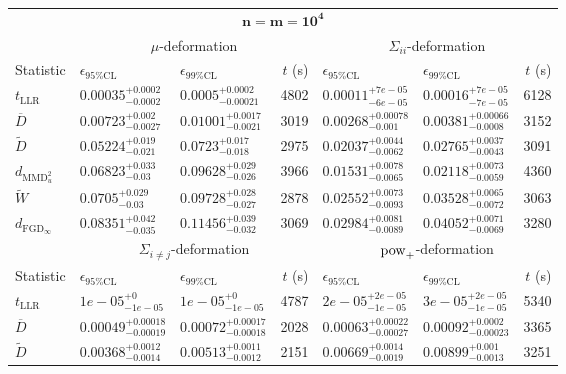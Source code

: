 \begin{tabular}{l|llr|llr}
	\toprule
	\multicolumn{7}{c}{$\mathbf{n=m=10^{4}}$} \\
	\multicolumn{1}{c}{} & \multicolumn{3}{c}{$\mu$-deformation} & \multicolumn{3}{c}{$\Sigma_{ii}$-deformation} \\
	Statistic & $\epsilon_{95\%\mathrm{CL}}$ & $\epsilon_{99\%\mathrm{CL}}$ & $t$ (s) & $\epsilon_{95\%\mathrm{CL}}$ & $\epsilon_{99\%\mathrm{CL}}$ & $t$ (s) \\
	\midrule
	$t_{\mathrm{LLR}}$ & $0.00035_{-0.0002}^{+0.0002}$ & $0.0005_{-0.00021}^{+0.0002}$ & 4802 & $0.00011_{-6e-05}^{+7e-05}$ & $0.00016_{-7e-05}^{+7e-05}$ & 6128 \\
	$\overline{D}$ & $0.00723_{-0.0027}^{+0.002}$ & $0.01001_{-0.0021}^{+0.0017}$ & 3019 & $0.00268_{-0.001}^{+0.00078}$ & $0.00381_{-0.0008}^{+0.00066}$ & 3152 \\
	$\widetilde{D}$ & $0.05224_{-0.021}^{+0.019}$ & $0.0723_{-0.018}^{+0.017}$ & 2975 & $0.02037_{-0.0062}^{+0.0044}$ & $0.02765_{-0.0043}^{+0.0037}$ & 3091 \\
	$d_{\mathrm{MMD}^{2}_{u}}$ & $0.06823_{-0.03}^{+0.033}$ & $0.09628_{-0.026}^{+0.029}$ & 3966 & $0.01531_{-0.0065}^{+0.0078}$ & $0.02118_{-0.0059}^{+0.0073}$ & 4360 \\
	$\widetilde{W}$ & $0.0705_{-0.03}^{+0.029}$ & $0.09728_{-0.027}^{+0.028}$ & 2878 & $0.02552_{-0.0093}^{+0.0073}$ & $0.03528_{-0.0072}^{+0.0065}$ & 3063 \\
	$d_{\mathrm{FGD}_{\infty}}$ & $0.08351_{-0.035}^{+0.042}$ & $0.11456_{-0.032}^{+0.039}$ & 3069 & $0.02984_{-0.0089}^{+0.0081}$ & $0.04052_{-0.0069}^{+0.0071}$ & 3280 \\
	\toprule
	\multicolumn{1}{c}{} & \multicolumn{3}{c}{$\Sigma_{i\neq j}$-deformation} & \multicolumn{3}{c}{$\rm{pow}_{+}$-deformation} \\
	Statistic & $\epsilon_{95\%\mathrm{CL}}$ & $\epsilon_{99\%\mathrm{CL}}$ & $t$ (s) & $\epsilon_{95\%\mathrm{CL}}$ & $\epsilon_{99\%\mathrm{CL}}$ & $t$ (s) \\
	\midrule
	$t_{\mathrm{LLR}}$ & $1e-05_{-1e-05}^{+0}$ & $1e-05_{-1e-05}^{+0}$ & 4787 & $2e-05_{-1e-05}^{+2e-05}$ & $3e-05_{-1e-05}^{+2e-05}$ & 5340 \\
	$\overline{D}$ & $0.00049_{-0.00019}^{+0.00018}$ & $0.00072_{-0.00018}^{+0.00017}$ & 2028 & $0.00063_{-0.00027}^{+0.00022}$ & $0.00092_{-0.00023}^{+0.0002}$ & 3365 \\
	$\widetilde{D}$ & $0.00368_{-0.0014}^{+0.0012}$ & $0.00513_{-0.0012}^{+0.0011}$ & 2151 & $0.00669_{-0.0019}^{+0.0014}$ & $0.00899_{-0.0013}^{+0.001}$ & 3251 \\

\end{tabular}
